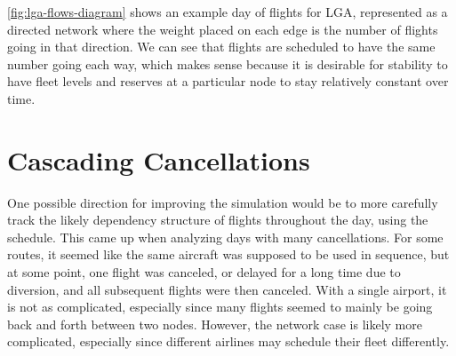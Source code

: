 \cref{fig:lga-flows-diagram} shows an example day of flights for LGA, represented as a directed network where the weight placed on each edge is the number of flights going in that direction. We can see that flights are scheduled to have the same number going each way, which makes sense because it is desirable for stability to have fleet levels and reserves at a particular node to stay relatively constant over time.

\section{Cascading Cancellations}

One possible direction for improving the simulation would be to more carefully track the likely dependency structure of flights throughout the day, using the schedule. This came up when analyzing days with many cancellations. For some routes, it seemed like the same aircraft was supposed to be used in sequence, but at some point, one flight was canceled, or delayed for a long time due to diversion, and all subsequent flights were then canceled. With a single airport, it is not as complicated, especially since many flights seemed to mainly be going back and forth between two nodes. However, the network case is likely more complicated, especially since different airlines may schedule their fleet differently.